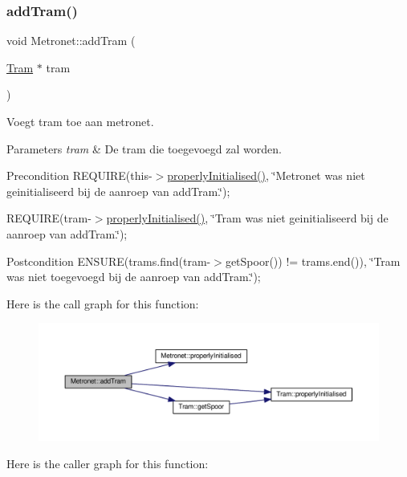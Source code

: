 \subsubsection{\texorpdfstring{add\+Tram()}{addTram()}}
{\footnotesize\ttfamily void Metronet\+::add\+Tram (\begin{DoxyParamCaption}\item[{\hyperlink{class_tram}{Tram} $\ast$}]{tram }\end{DoxyParamCaption})}



Voegt tram toe aan metronet. 


\begin{DoxyParams}{Parameters}
{\em tram} & De tram die toegevoegd zal worden. \\
\hline
\end{DoxyParams}
\begin{DoxyPrecond}{Precondition}
R\+E\+Q\+U\+I\+RE(this-\/$>$\hyperlink{class_metronet_a3d2adce29a947f162924279b766de645}{properly\+Initialised()}, \char`\"{}\+Metronet was niet geinitialiseerd bij de aanroep van add\+Tram.\char`\"{}); 

R\+E\+Q\+U\+I\+RE(tram-\/$>$\hyperlink{class_metronet_a3d2adce29a947f162924279b766de645}{properly\+Initialised()}, \char`\"{}\+Tram was niet geinitialiseerd bij de aanroep van add\+Tram.\char`\"{}); 
\end{DoxyPrecond}
\begin{DoxyPostcond}{Postcondition}
E\+N\+S\+U\+RE(trams.\+find(tram-\/$>$get\+Spoor()) != trams.\+end()), \char`\"{}\+Tram was niet toegevoegd bij de aanroep van add\+Tram.\char`\"{}); 
\end{DoxyPostcond}
Here is the call graph for this function\+:\nopagebreak
\begin{figure}[H]
\begin{center}
\leavevmode
\includegraphics[width=350pt]{class_metronet_a3a01132772f4a367d83af40a3c02e224_cgraph}
\end{center}
\end{figure}
Here is the caller graph for this function\+:\nopagebreak
